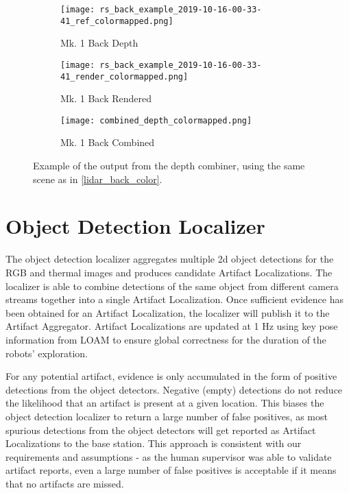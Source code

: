 \begin{figure}
	\centering
	\begin{subfigure}{0.32\textwidth}
		\texttt{[image: rs\_back\_example\_2019-10-16-00-33-41\_ref\_colormapped.png]}
		\caption{Mk. 1 Back Depth}
		\label{combined_depth_realsense}		
	\end{subfigure}
	\hfill
	\begin{subfigure}{0.32\textwidth}
		\texttt{[image: rs\_back\_example\_2019-10-16-00-33-41\_render\_colormapped.png]}
		\caption{Mk. 1 Back Rendered}
		\label{combined_depth_lidar}
	\end{subfigure}	
	\hfill
	\begin{subfigure}{0.32\textwidth}
		\texttt{[image: combined\_depth\_colormapped.png]}
		\caption{Mk. 1 Back Combined}
		\label{combined_depth_output}
	\end{subfigure}		
	\caption[Depth combiner sample output]{Example of the output from the depth combiner, using the same scene as in \ref{lidar_back_color}.}
	\label{combined_depth}
\end{figure}


\section{Object Detection Localizer}

The object detection localizer aggregates multiple 2d object detections for the RGB and thermal images and produces candidate Artifact Localizations. The localizer is able to combine detections of the same object from different camera streams together into a single Artifact Localization. Once sufficient evidence has been obtained for an Artifact Localization, the localizer will publish it to the Artifact Aggregator. Artifact Localizations are updated at 1 Hz using key pose information from LOAM to ensure global correctness for the duration of the robots' exploration. 

For any potential artifact, evidence is only accumulated in the form of positive detections from the object detectors. Negative (empty) detections do not reduce the likelihood that an artifact is present at a given location. This biases the object detection localizer to return a large number of false positives, as most spurious detections from the object detectors will get reported as Artifact Localizations to the base station. This approach is consistent with our requirements and assumptions - as the human supervisor was able to validate artifact reports, even a large number of false positives is acceptable if it means that no artifacts are missed.

